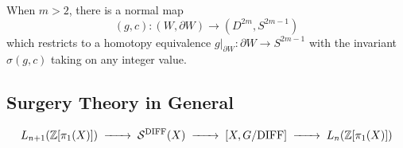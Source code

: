 \begin{definition}
\end{definition}

\begin{theorem}\label{thm:plumbing-theorem}
	When $m>2$, there is a normal map \[(g,c) : (W,\partial W) \to (D^{2m}, S^{2m-1})\] which restricts to a homotopy equivalence $g|_{\partial W} : \partial W \to  S^{2m-1}$ with the invariant $\sigma(g,c)$ taking on any integer value.
\end{theorem}

\subsection{Surgery Theory in General}
\[
	L_{n+1}(\Z[\pi_1(X)]) \lkxto \mathcal{S}^\DIFF(X) \lkxto {[X, G/\DIFF]} \lkxto L_n(\Z[\pi_1(X)])
\]

